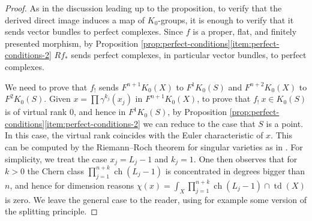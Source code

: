 \documentclass[JEP,XML,SOM,Unicode,published]{cedram}
\theoremstyle{plain}
\theoremstyle{definition}
\DeclareMathOperator{\ch}{ch}
\DeclareMathOperator{\td}{td}
\begin{document}
\begin{proof}
As in the discussion leading up to the proposition, to verify that the derived direct image induces a map of $K_0$-groups, it is enough to verify that it sends vector bundles to perfect complexes. Since $f$ is a proper, flat, and finitely presented morphism, by Proposition \ref{prop:perfect-conditions}\eqref{item:perfect-conditions-2} $Rf_{\ast}$ sends perfect complexes, in particular vector bundles, to perfect complexes.

We need to prove that $f_!$ sends $F^{n+1} K_0(X)$ to $F^1 K_0(S)$ and $F^{n+2} K_0(X)$ to $F^2 K_0(S)$. Given $x=\prod \gamma^{k_j}(x_j)$ in $F^{n+1} K_0(X)$, to prove that $f_!\ x \in K_0(S)$ is of virtual rank 0, and hence in $F^1 K_0(S)$, by Proposition \ref{prop:perfect-conditions}\eqref{item:perfect-conditions-2} we can reduce to the case that $S$ is a point. In this case, the virtual rank coincides with the Euler characteristic of $x$. This can be computed by the Riemann--Roch theorem for singular varieties as in \cite[Cor.\,18.3.1]{Fulton}. For simplicity, we treat the case $x_j = L_j-1$ and $k_j=1$. One then observes that for $k>0$ the Chern class $\prod_{j=1}^{n+k}\ch(L_{j}-1)$ is concentrated in degrees bigger than $n$, and hence for dimension reasons $\chi(x) = \int_{X} \prod_{j=1}^{n+k}\ch(L_{j}-1) \cap \td(X)$ is zero. We leave the general case to the reader, using for example some version of the splitting principle.


\end{proof}
\end{document}
